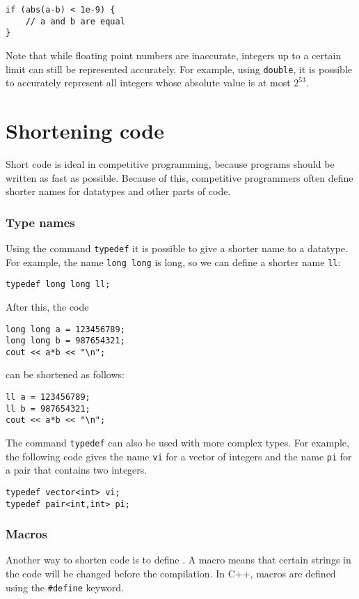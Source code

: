 \begin{lstlisting}
if (abs(a-b) < 1e-9) {
    // a and b are equal
}
\end{lstlisting}

Note that while floating point numbers are inaccurate,
integers up to a certain limit can still be
represented accurately.
For example, using \texttt{double},
it is possible to accurately represent all
integers whose absolute value is at most $2^{53}$.

\section{Shortening code}

Short code is ideal in competitive programming,
because programs should be written
as fast as possible.
Because of this, competitive programmers often define
shorter names for datatypes and other parts of code.

\subsubsection{Type names}
Using the command \texttt{typedef}
it is possible to give a shorter name
to a datatype.
For example, the name \texttt{long long} is long,
so we can define a shorter name \texttt{ll}:
\begin{lstlisting}
typedef long long ll;
\end{lstlisting}
After this, the code
\begin{lstlisting}
long long a = 123456789;
long long b = 987654321;
cout << a*b << "\n";
\end{lstlisting}
can be shortened as follows:
\begin{lstlisting}
ll a = 123456789;
ll b = 987654321;
cout << a*b << "\n";
\end{lstlisting}

The command \texttt{typedef}
can also be used with more complex types.
For example, the following code gives
the name \texttt{vi} for a vector of integers
and the name \texttt{pi} for a pair
that contains two integers.
\begin{lstlisting}
typedef vector<int> vi;
typedef pair<int,int> pi;
\end{lstlisting}

\subsubsection{Macros}
Another way to shorten code is to define
.
A macro means that certain strings in
the code will be changed before the compilation.
In C++, macros are defined using the
\texttt{\#define} keyword.


